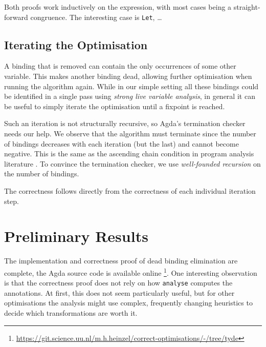 \documentclass[sigplan,nonacm,screen,review,timestamp]{acmart}
\newcommand{\Todo}[1]{\todo[inline,backgroundcolor=orange!30]{TODO: #1}}
\newcommand{\I}[1]{\texttt{#1}\xspace}
\begin{document}
Both proofs work inductively on the expression, with most cases being a straight-forward congruence.
The interesting case is \I{Let}, \ldots

\Todo{continue}

\subsection{Iterating the Optimisation}


A binding that is removed can contain the only occurrences of some other variable.
This makes another binding dead, allowing further optimisation when running the algorithm again.
While in our simple setting all these bindings could be identified in a single pass
using \emph{strong live variable analysis},
in general it can be useful to simply iterate the optimisation until a fixpoint is reached.

Such an iteration is not structurally recursive, so Agda's termination checker needs our help.
We observe that the algorithm must terminate
since the number of bindings decreases with each iteration (but the last) and cannot become negative.
This is the same as the ascending chain condition in program analysis literature
\cite{nielsen1999analysis}.
To convince the termination checker, we use \emph{well-founded recursion} \cite{bove2016recursion}
on the number of bindings.

The correctness follows directly from the correctness of each individual iteration step.

\section{Preliminary Results}

The implementation and correctness proof of dead binding elimination are complete,
the Agda source code is available online
\footnote{\url{https://git.science.uu.nl/m.h.heinzel/correct-optimisations/-/tree/tyde}}.
One interesting observation is that the correctness proof does not rely on how
\I{analyse} computes the annotations.
At first, this does not seem particularly useful,
but for other optimisations the analysis might use complex, frequently changing heuristics to decide
which transformations are worth it.
\end{document}
